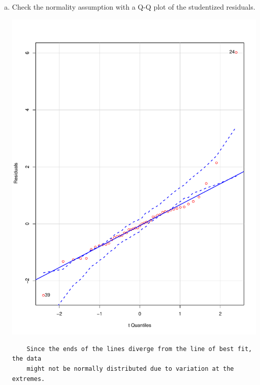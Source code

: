 \documentclass[12pt,letterpaper]{article}
\begin{document}
\begin{enumerate}[(a)]
	\item Check the normality assumption with a Q-Q plot of the studentized residuals. 
	 
	 \includegraphics[width=.75\textwidth]{qqplot.pdf}
	\begin{verbatim}
	Since the ends of the lines diverge from the line of best fit, the data
	might not be normally distributed due to variation at the extremes.
	\end{verbatim}
	

\end{enumerate}
\end{document}
